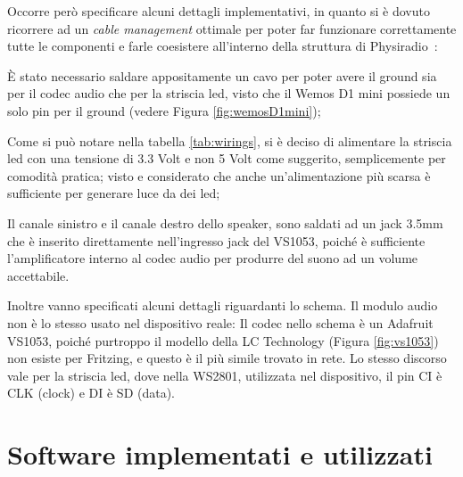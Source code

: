 \documentclass[12pt,a4paper]{report}
\newcommand{\physiradio}{Physiradio} %
\begin{document}
Occorre però specificare alcuni dettagli implementativi, in quanto si è dovuto ricorrere ad un \textit{cable management} ottimale per poter far funzionare correttamente tutte le componenti e farle coesistere all'interno della struttura di \physiradio\ : 
\begin{compactitem}
	\item È stato necessario saldare appositamente un cavo per poter avere il ground sia per il codec audio che per la striscia led, visto che il Wemos D1 mini possiede un solo pin per il ground (vedere Figura \ref{fig:wemosD1mini});
	\item Come si può notare nella tabella \ref{tab:wirings}, si è deciso di alimentare la striscia led con una tensione di 3.3 Volt e non 5 Volt come suggerito, semplicemente per comodità pratica; visto e considerato che anche un'alimentazione più scarsa è sufficiente per generare luce da dei led;
	\item Il canale sinistro e il canale destro dello speaker, sono saldati ad un jack 3.5mm che è inserito direttamente nell'ingresso jack del VS1053, poiché è sufficiente l'amplificatore interno al codec audio per produrre del suono ad un volume accettabile. 
\end{compactitem}

\medskip
Inoltre vanno specificati alcuni dettagli riguardanti lo schema. Il modulo audio non è lo stesso usato nel dispositivo reale: Il codec nello schema è un Adafruit VS1053, poiché purtroppo il modello della LC Technology (Figura \ref{fig:vs1053}) non esiste per Fritzing, e questo è il più simile trovato in rete. Lo stesso discorso vale per la striscia led, dove nella WS2801, utilizzata nel dispositivo, il pin CI è CLK (clock) e DI è SD (data).

\newpage
\section{Software implementati e utilizzati}
\end{document}
